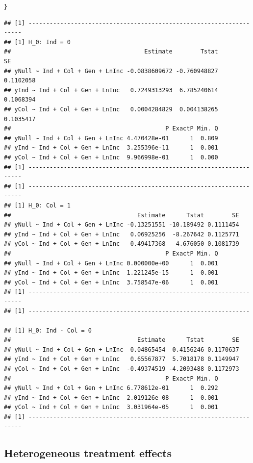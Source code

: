 \documentclass[11pt, a4paper]{article}\usepackage[]{graphicx}\usepackage[]{color}
\makeatletter
\newcommand{\hlstd}[1]{\textcolor[rgb]{0.345,0.345,0.345}{#1}}%
\newenvironment{kframe}{%
 \def\at@end@of@kframe{}%
 \ifinner\ifhmode%
  \def\at@end@of@kframe{\end{minipage}}%
  \begin{minipage}{\columnwidth}%
 \fi\fi%
 \def\FrameCommand##1{\hskip\@totalleftmargin \hskip-\fboxsep
 \colorbox{shadecolor}{##1}\hskip-\fboxsep
     \hskip-\linewidth \hskip-\@totalleftmargin \hskip\columnwidth}%
 \MakeFramed {\advance\hsize-\width
   \@totalleftmargin\z@ \linewidth\hsize
   \@setminipage}}%
 {\par\unskip\endMakeFramed%
 \at@end@of@kframe}
\newenvironment{knitrout}{}{} %
\makeatother
\begin{document}
\begin{footnotesize}
\begin{knitrout}
\begin{kframe}
\begin{alltt}
    \hlstd{\}}
\end{alltt}
\begin{verbatim}
## [1] --------------------------------------------------------------------
## [1] H_0: Ind = 0
##                                      Estimate        Tstat        SE
## yNull ~ Ind + Col + Gen + LnInc -0.0838609672 -0.760948827 0.1102058
## yInd ~ Ind + Col + Gen + LnInc   0.7249313293  6.785240614 0.1068394
## yCol ~ Ind + Col + Gen + LnInc   0.0004284829  0.004138265 0.1035417
##                                            P ExactP Min. Q
## yNull ~ Ind + Col + Gen + LnInc 4.470428e-01      1  0.809
## yInd ~ Ind + Col + Gen + LnInc  3.255396e-11      1  0.001
## yCol ~ Ind + Col + Gen + LnInc  9.966998e-01      1  0.000
## [1] --------------------------------------------------------------------
## [1] --------------------------------------------------------------------
## [1] H_0: Col = 1
##                                    Estimate      Tstat        SE
## yNull ~ Ind + Col + Gen + LnInc -0.13251551 -10.189492 0.1111454
## yInd ~ Ind + Col + Gen + LnInc   0.06925256  -8.267642 0.1125771
## yCol ~ Ind + Col + Gen + LnInc   0.49417368  -4.676050 0.1081739
##                                            P ExactP Min. Q
## yNull ~ Ind + Col + Gen + LnInc 0.000000e+00      1  0.001
## yInd ~ Ind + Col + Gen + LnInc  1.221245e-15      1  0.001
## yCol ~ Ind + Col + Gen + LnInc  3.758547e-06      1  0.001
## [1] --------------------------------------------------------------------
## [1] --------------------------------------------------------------------
## [1] H_0: Ind - Col = 0
##                                    Estimate      Tstat        SE
## yNull ~ Ind + Col + Gen + LnInc  0.04865454  0.4156246 0.1170637
## yInd ~ Ind + Col + Gen + LnInc   0.65567877  5.7018178 0.1149947
## yCol ~ Ind + Col + Gen + LnInc  -0.49374519 -4.2093488 0.1172973
##                                            P ExactP Min. Q
## yNull ~ Ind + Col + Gen + LnInc 6.778612e-01      1  0.292
## yInd ~ Ind + Col + Gen + LnInc  2.019126e-08      1  0.001
## yCol ~ Ind + Col + Gen + LnInc  3.031964e-05      1  0.001
## [1] --------------------------------------------------------------------
\end{verbatim}
\end{kframe}
\end{knitrout}

    \subsection{Heterogeneous treatment effects}


\end{footnotesize}
\end{document}

